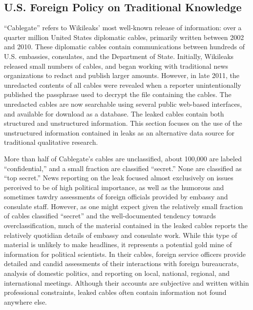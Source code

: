 \documentclass[12pt]{article}
\begin{document}
\subsection{U.S. Foreign Policy on Traditional Knowledge}
\label{tk}

``Cablegate'' refers to Wikileaks' most well-known release of information: over a quarter million 
United States diplomatic cables, primarily written between 2002 and 2010. These diplomatic cables 
contain communications between hundreds of U.S. embassies, consulates, and the Department of State. 
Initially, Wikileaks released small numbers of cables, and began working with traditional news 
organizations to redact and publish larger amounts. However, in late 2011, the unredacted 
contents of all cables were revealed when a reporter unintentionally published the passphrase used 
to decrypt the file containing the cables. The unredacted cables are now searchable 
using several public web-based interfaces, and available for download as a database. 
The leaked cables contain both structured and unstructured information. 
This section focuses on the use of the unstructured information contained in leaks as an alternative 
data source for traditional qualitative research.

More than half of Cablegate's cables are unclassified, about 100,000 are labeled ``confidential,'' 
and a small 
fraction are classified ``secret.'' None are classified as ``top secret.'' News reporting on the leak 
focused almost exclusively on issues perceived to be of high political importance, as well as 
the humorous and sometimes tawdry assessments of foreign officials provided by embassy and consulate 
staff. However, as one might expect given the relatively small fraction of cables classified ``secret'' 
and 
the well-documented tendency towards overclassification, much of the material 
contained in the leaked cables reports the relatively quotidian details of embassy and consulate 
work. 
While this type of material is unlikely to make headlines, it represents a potential gold mine 
of information for political scientists. In their cables, foreign service officers provide detailed 
and candid assessments of their interactions with foreign bureaucrats, analysis of domestic politics, 
and reporting on local, national, regional, and international meetings. Although their accounts are 
subjective and written within professional constraints, leaked cables often contain information 
not found anywhere else.
\end{document}
